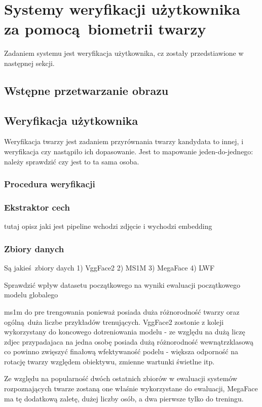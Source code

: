 \section[verification]{Systemy weryfikacji użytkownika za pomocą biometrii twarzy}
Zadaniem systemu jest weryfikacja użytkownika, cz zostały przedstiawione w następnej sekcji.

\subsection{Wstępne przetwarzanie obrazu}

\subsection{Weryfikacja użytkownika}

Weryfikacja twarzy jest zadaniem przyrównania twarzy
kandydata to innej, i weryfikacja czy nastąpiło ich dopasowanie. Jest to mapowanie
jeden-do-jednego: należy sprawdzić czy jest to ta sama osoba.

\subsubsection{Procedura weryfikacji} 

\subsubsection{Ekstraktor cech}
tutaj opisz jaki jest pipeline  
wchodzi zdjęcie i wychodzi embedding

\subsubsection{Zbiory danych}
Są jakieś zbiory daych 
1) VggFace2
2) MS1M
3) MegaFace
4) LWF

Sprawdzić wpływ datasetu początkowego na wyniki ewaluacji początkowego modelu globalego

ms1m do pre trengowania ponieważ posiada duża różnorodność twarzy oraz ogólną duża liczbe przykładów trenujących. VggFace2 zostonie z koleji wykorzystany do koncowego dotreniowania modelu - ze względu na dużą liczę zdjec przypadajaca na jedna osobę posiada dużą różnorodność wewnątrzklasową co powinno zwięszyć finałową wfektywaność podelu - większa odporność na rotację twarzy względem obiektywu, zmienne wartunki świetlne itp.

Ze względu na popularność dwóch ostatnich zbiorów w ewaluacji systemów rozpoznających twarze zostaną one właśnie wykorzystane do ewaluacji, MegaFace ma tę dodatkową zaletę, dużej liczby osób, a dwa pierwsze tylko do treningu.



